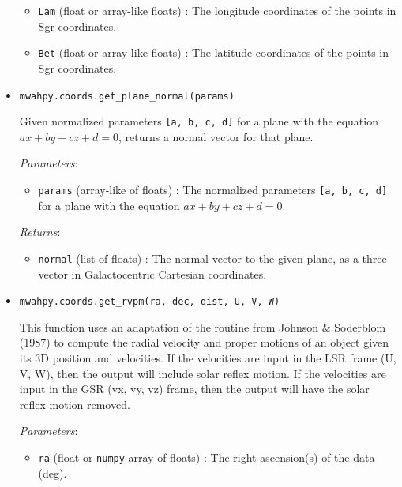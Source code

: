 \documentclass{article}
\begin{document}
\begin{itemize}
\begin{itemize}
\item \verb!Lam! (float or array-like floats) : The longitude coordinates of the points in Sgr coordinates.

\item \verb!Bet! (float or array-like floats) : The latitude coordinates of the points in Sgr coordinates.

\end{itemize}



\item \verb!mwahpy.coords.get_plane_normal(params)!

Given normalized parameters \verb![a, b, c, d]! for a plane with the equation $ax + by + cz + d = 0$, returns a normal vector for that plane.

\textit{Parameters}: \begin{itemize}

\item \verb!params! (array-like of floats) : The normalized parameters \verb![a, b, c, d]! for a plane with the equation $ax + by + cz + d = 0$.

\end{itemize}

\textit{Returns}: \begin{itemize}

\item \verb!normal! (list of floats) : The normal vector to the given plane, as a three-vector in Galactocentric Cartesian coordinates.

\end{itemize}



\item \verb!mwahpy.coords.get_rvpm(ra, dec, dist, U, V, W)!

This function uses an adaptation of the routine from Johnson \& Soderblom (1987) to compute the radial velocity and proper motions of an object given its 3D position and velocities. If the velocities are input in the LSR frame (U, V, W), then the output will include solar reflex motion. If the velocities are input in the GSR (vx, vy, vz) frame, then the output will have the solar reflex motion removed. 

\textit{Parameters}: \begin{itemize}

\item \verb!ra! (float or \verb!numpy! array of floats) : The right ascension(s) of the data (deg).


\end{itemize}
\end{itemize}
\end{document}
